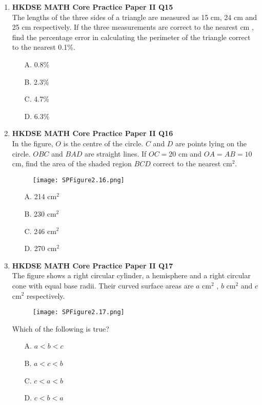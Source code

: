 \documentclass[12pt]{article}
\begin{document}
\begin{enumerate}
	\item \textbf{HKDSE MATH Core Practice Paper II Q15}\\
	The lengths of the three sides of a triangle are measured as 15 cm, 24 cm and 25 cm respectively. If the three measurements are correct to the nearest cm , find the percentage error in calculating the perimeter of the triangle correct to the nearest 0.1\%.
	\begin{enumerate}
		\item[A.] 0.8\%
		\item[B.] 2.3\%
		\item[C.] 4.7\%
		\item[D.] 6.3\%
	\end{enumerate}

	\item \textbf{HKDSE MATH Core Practice Paper II Q16}\\
	In the figure, $O$ is the centre of the circle. $C$ and $D$ are points lying on the circle. $OBC$ and $BAD$ are straight lines. If $OC = 20$ cm and $OA = AB = 10$ cm, find the area of the shaded region $BCD$ correct to the nearest cm$^2$.
	\begin{figure}[h]
		\centering
		\texttt{[image: SPFigure2.16.png]}	
	\end{figure}
	\begin{enumerate}
		\item[A.] 214 cm$^2$
		\item[B.] 230 cm$^2$
		\item[C.] 246 cm$^2$
		\item[D.] 270 cm$^2$
	\end{enumerate}

	\item \textbf{HKDSE MATH Core Practice Paper II Q17}\\
	The figure shows a right circular cylinder, a hemisphere and a right circular cone with equal base radii. Their curved surface areas are $a$ cm$^2$ , $b$ cm$^2$ and $c$ cm$^2$ respectively.\\
	\begin{figure}[H]
		\centering
		\texttt{[image: SPFigure2.17.png]}	
	\end{figure}
	Which of the following is true?
	\begin{enumerate}
		\item[A.] $a < b < c$
		\item[B.] $a < c < b$
		\item[C.] $c < a < b$
		\item[D.] $c < b < a$
	\end{enumerate}


\end{enumerate}
\end{document}
